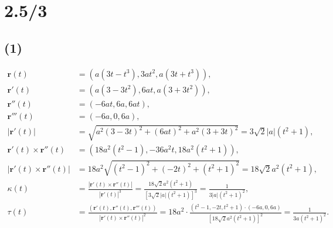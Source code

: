 \documentclass[11pt,a4paper]{article}
\author{刘逸灏 (515370910207)}
\begin{document}
\maketitle

\section{2.5/3}

\subsection*{(1)}
\begin{align*}
  \mathbf{r}(t)                         & =(a(3t-t^3),3at^2,a(3t+t^3)),            \\
  \mathbf{r}'(t)                        & =(a(3-3t^2),6at,a(3+3t^2)),              \\
  \mathbf{r}''(t)                       & =(-6at,6a,6at),                          \\
  \mathbf{r}'''(t)                      & =(-6a,0,6a),                             \\
  |\mathbf{r}'(t)|                      & =\sqrt{a^2(3-3t)^2+(6at)^2+a^2(3+3t)^2}
  =3\sqrt{2}|a|(t^2+1),                                                            \\
  \mathbf{r}'(t)\times\mathbf{r}''(t)   &
  =(18a^2(t^2-1),-36a^2t,18a^2(t^2+1)),                                            \\
  |\mathbf{r}'(t)\times\mathbf{r}''(t)| & =18a^2\sqrt{(t^2-1)^2+(-2t)^2+(t^2+1)^2}
  =18\sqrt{2}a^2(t^2+1),                                                           \\
  \kappa(t)                             &
  =\frac{|\mathbf{r}'(t)\times\mathbf{r}''(t)|}{|\mathbf{r}'(t)|^3}
  =\frac{18\sqrt{2}a^2(t^2+1)}{[3\sqrt{2}|a|(t^2+1)]^3}=\frac{1}{3|a|(t^2+1)^2},   \\
  \tau(t)                               &
  =\frac{(\mathbf{r}'(t),\mathbf{r}''(t),\mathbf{r}'''(t))}{|\mathbf{r}'(t)\times\mathbf{r}''(t)|^2}=18a^2\cdot\frac{(t^2-1,-2t,t^2+1)\cdot(-6a,0,6a)}{[18\sqrt{2}a^2(t^2+1)]^2}=\frac{1}{3a(t^2+1)^2}.
\end{align*}
\end{document}
